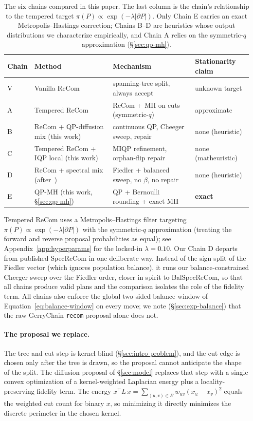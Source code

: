 \documentclass[11pt]{article}
\begin{document}
\begin{table}[htbp]
\centering
\small
\begin{tabular}{llll}
\toprule
Chain & Method & Mechanism & Stationarity claim \\
\midrule
V & Vanilla ReCom~\cite{deford2021recombination} & spanning-tree split, always accept & unknown target \\
A & Tempered ReCom & ReCom + MH on cuts (symmetric-$q$) & approximate \\
B & ReCom + QP-diffusion mix (this work) & continuous QP, Cheeger sweep, repair & none (heuristic) \\
C & Tempered ReCom + IQP local (this work) & MIQP refinement, orphan-flip repair & none (matheuristic) \\
D & ReCom + spectral mix (after~\cite{davies2025spectral}) & Fiedler + balanced sweep, no $\beta$, no repair & none (heuristic) \\
E & QP-MH (this work, \S\ref{sec:qp-mh}) & QP + Bernoulli rounding + exact MH & \textbf{exact} \\
\bottomrule
\end{tabular}
\caption{The six chains compared in this paper. The last column is the
  chain's relationship to the tempered target
  $\pi(P) \propto \exp(-\lambda|\partial P|)$. Only Chain E carries an
  exact Metropolis--Hastings correction; Chains B--D are heuristics
  whose output distributions we characterize empirically, and Chain A
  relies on the symmetric-$q$ approximation
  (\S\ref{sec:qp-mh}).}
\label{tab:five-chains}
\end{table}

Tempered ReCom uses a Metropolis--Hastings filter targeting
$\pi(P) \propto \exp(-\lambda |\partial P|)$ with the symmetric-$q$
approximation (treating the forward and reverse proposal probabilities
as equal); see Appendix~\ref{app:hyperparams} for the locked-in
$\lambda = 0.10$. Our Chain D departs from published SpecReCom in one
deliberate way. Instead of the sign split of the Fiedler vector (which
ignores population balance), it runs our balance-constrained Cheeger
sweep over the Fiedler order, closer in spirit to BalSpecReCom, so that all chains produce valid plans and the comparison isolates the
role of the fidelity term. All chains also enforce the global
two-sided balance window of Equation~\eqref{eq:balance-window} on
every move; we note (\S\ref{sec:exp-balance}) that the raw GerryChain
\texttt{recom} proposal alone does not.

\paragraph{The proposal we replace.}\label{sec:background-weakness}
The tree-and-cut step is kernel-blind (\S\ref{sec:intro-problem}),
and the cut edge is chosen only after the tree is drawn, so the
proposal cannot anticipate the shape of the split. The diffusion
proposal of \S\ref{sec:model} replaces that step with a single convex
optimization of a kernel-weighted Laplacian energy plus a
locality-preserving fidelity term. The energy
$x^\top L\, x = \sum_{(u,v) \in E} w_{uv} (x_u - x_v)^2$ equals the
weighted cut count for binary $x$, so minimizing it directly
minimizes the discrete perimeter in the chosen kernel.
\end{document}
